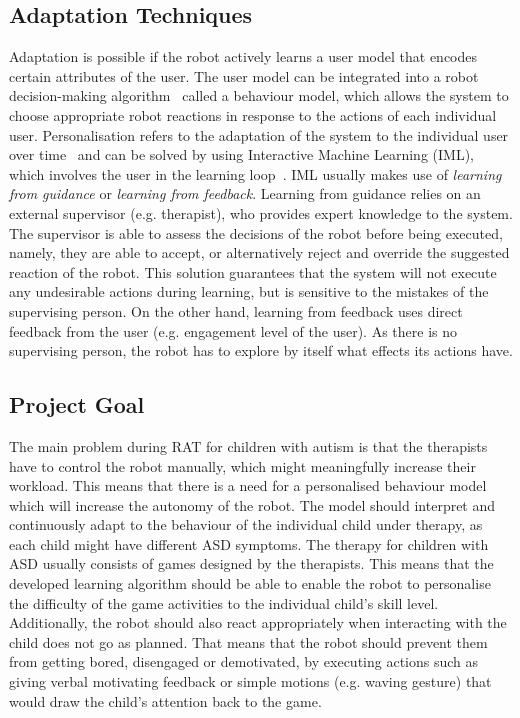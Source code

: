 \documentclass[thesis]{mas_proposal}
\begin{document}
\subsection{Adaptation Techniques}
Adaptation is possible if the robot actively learns a user model that encodes certain attributes of the user. The user model can be integrated into a robot decision-making algorithm~\cite{rossi2017user} called a behaviour model, which allows the system to choose appropriate robot reactions in response to the actions of each individual user. Personalisation refers to the adaptation of the system to the individual user over time~\cite{rossi2017user} and can be solved by using Interactive Machine Learning (IML), which involves the user in the learning loop~\cite{senft2019teaching}. IML usually makes use of \emph{learning from guidance} or \emph{learning from feedback}. Learning from guidance relies on an external supervisor (e.g. therapist), who provides expert knowledge to the system. The supervisor is able to assess the decisions of the robot before being executed, namely, they are able to accept, or alternatively reject and override the suggested reaction of the robot. This solution guarantees that the system will not execute any undesirable actions during learning, but is sensitive to the mistakes of the supervising person. On the other hand, learning from feedback uses direct feedback from the user (e.g. engagement level of the user). As there is no supervising person, the robot has to explore by itself what effects its actions have. 

\subsection{Project Goal}
\label{subsec:project_goal}
The main problem during RAT for children with autism is that the therapists have to control the robot manually, which might meaningfully increase their workload. This means that there is a need for a personalised behaviour model which will increase the autonomy of the robot. The model should interpret and continuously adapt to the behaviour of the individual child under therapy, as each child might have different ASD symptoms. The therapy for children with ASD usually consists of games designed by the therapists. This means that the developed learning algorithm should be able to enable the robot to personalise the difficulty of the game activities to the individual child's skill level. Additionally, the robot should also react appropriately when interacting with the child does not go as planned. That means that the robot should prevent them from getting bored, disengaged or demotivated, by executing actions such as giving verbal motivating feedback or simple motions (e.g. waving gesture) that would draw the child’s attention back to the game.
\end{document}
